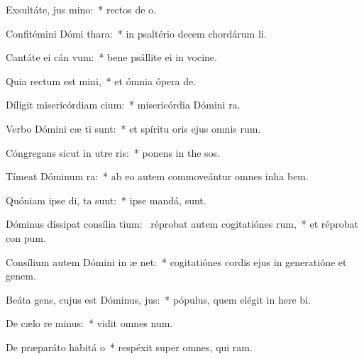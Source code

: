 \item Exsultáte, jus  mino:~* rectos de o.
\item Confitémini Dómi  thara:~* in psaltério decem chordárum  li.
\item Cantáte ei cán vum:~* bene psállite ei in vocine.
\item Quia rectum est  mini,~* et ómnia ópera   de.
\item Díligit misericórdiam  cium:~* misericórdia Dómini   ra.
\item Verbo Dómini cæ ti sunt:~* et spíritu oris ejus omnis  rum.
\item Cóngregans sicut in utre  ris:~* ponens in the sos.
\item Tímeat Dóminum  ra:~* ab eo autem commoveántur omnes inha bem.
\item Quóniam ipse di,  ta sunt:~* ipse mandá,   sunt.
\item Dóminus díssipat consília tium:~\pscross{} réprobat autem cogitatiónes rum,~* et réprobat con pum.
\item Consílium autem Dómini in æ net:~* cogitatiónes cordis ejus in generatióne et genem.
\item Beáta gens, cujus est Dóminus,  jus:~* pópulus, quem elégit in here bi.
\item De cælo re minus:~* vidit omnes  num.
\item De præparáto habitá o~* respéxit super omnes, qui  ram.
